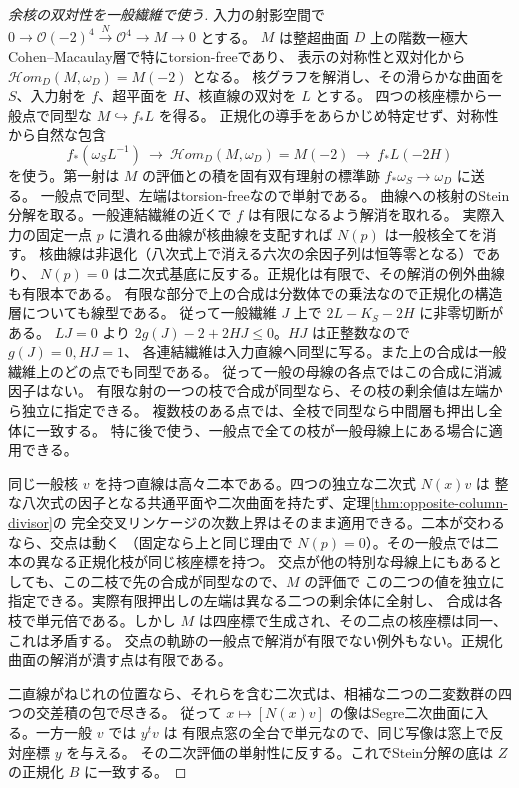 \begin{proof}[余核の双対性を一般繊維で使う]
入力の射影空間で $0\to\mathcal O(-2)^4\xrightarrow{N}\mathcal O^4\to M\to0$ とする。
$M$ は整超曲面 $D$ 上の階数一極大Cohen--Macaulay層で特にtorsion-freeであり、
表示の対称性と双対化から $\mathcal Hom_D(M,\omega_D)=M(-2)$ となる。
核グラフを解消し、その滑らかな曲面を $S$、入力射を $f$、超平面を $H$、核直線の双対を $L$ とする。
四つの核座標から一般点で同型な $M\hookrightarrow f_*L$ を得る。
正規化の導手をあらかじめ特定せず、対称性から自然な包含
\[
      f_*(\omega_S L^{-1})\ \longrightarrow\
      \mathcal Hom_D(M,\omega_D)=M(-2)\ \longrightarrow\ f_*L(-2H)
\]
を使う。第一射は $M$ の評価との積を固有双有理射の標準跡 $f_*\omega_S\to\omega_D$ に送る。
一般点で同型、左端はtorsion-freeなので単射である。
曲線への核射のStein分解を取る。一般連結繊維の近くで $f$ は有限になるよう解消を取れる。
実際入力の固定一点 $p$ に潰れる曲線が核曲線を支配すれば $N(p)$ は一般核全てを消す。
核曲線は非退化（八次式上で消える六次の余因子列は恒等零となる）であり、
$N(p)=0$ は二次式基底に反する。正規化は有限で、その解消の例外曲線も有限本である。
有限な部分で上の合成は分数体での乗法なので正規化の構造層についても線型である。
従って一般繊維 $J$ 上で $2L-K_S-2H$ に非零切断がある。
$LJ=0$ より $2g(J)-2+2HJ\le0$。$HJ$ は正整数なので $g(J)=0,HJ=1$、
各連結繊維は入力直線へ同型に写る。また上の合成は一般繊維上のどの点でも同型である。
従って一般の母線の各点ではこの合成に消滅因子はない。
有限な射の一つの枝で合成が同型なら、その枝の剰余値は左端から独立に指定できる。
複数枝のある点では、全枝で同型なら中間層も押出し全体に一致する。
特に後で使う、一般点で全ての枝が一般母線上にある場合に適用できる。

同じ一般核 $v$ を持つ直線は高々二本である。四つの独立な二次式 $N(x)v$ は
整な八次式の因子となる共通平面や二次曲面を持たず、定理\ref{thm:opposite-column-divisor}の
完全交叉リンケージの次数上界はそのまま適用できる。二本が交わるなら、交点は動く
（固定なら上と同じ理由で $N(p)=0$）。その一般点では二本の異なる正規化枝が同じ核座標を持つ。
交点が他の特別な母線上にもあるとしても、この二枝で先の合成が同型なので、$M$ の評価で
この二つの値を独立に指定できる。実際有限押出しの左端は異なる二つの剰余体に全射し、
合成は各枝で単元倍である。しかし $M$ は四座標で生成され、その二点の核座標は同一、これは矛盾する。
交点の軌跡の一般点で解消が有限でない例外もない。正規化曲面の解消が潰す点は有限である。

二直線がねじれの位置なら、それらを含む二次式は、相補な二つの二変数群の四つの交差積の包で尽きる。
従って $x\mapsto[N(x)v]$ の像はSegre二次曲面に入る。一方一般 $v$ では $y^tv$ は
有限点窓の全台で単元なので、同じ写像は窓上で反対座標 $y$ を与える。
その二次評価の単射性に反する。これでStein分解の底は $Z$ の正規化 $B$ に一致する。


\end{proof}
